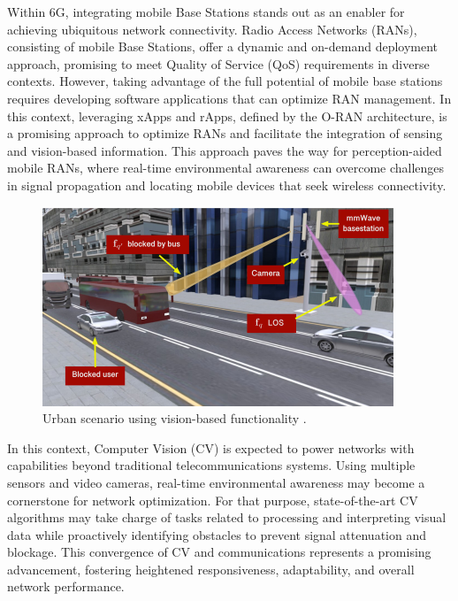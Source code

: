 Within 6G, integrating mobile Base Stations stands out as an enabler for achieving ubiquitous network connectivity. Radio Access Networks (RANs), consisting of mobile Base Stations, offer a dynamic and on-demand deployment approach, promising to meet Quality of Service (QoS) requirements in diverse contexts. However, taking advantage of the full potential of mobile base stations requires developing software applications that can optimize RAN management. In this context, leveraging xApps and rApps, defined by the O-RAN architecture, is a promising approach to optimize RANs and facilitate the integration of sensing and vision-based information. This approach paves the way for perception-aided mobile RANs, where real-time environmental awareness can overcome challenges in signal propagation and locating mobile devices that seek wireless connectivity.

\begin{figure}
    \centering
    \includegraphics{figures/urban_scenario.png}
    \caption[Urban scenario using vision-based functionality]{Urban scenario using vision-based functionality \cite{Block_predict}.}
    \label{fig:urban_scenario}
\end{figure}

In this context, Computer Vision (CV) is expected to power networks with capabilities beyond traditional telecommunications systems. Using multiple sensors and video cameras, real-time environmental awareness may become a cornerstone for network optimization. For that purpose, state-of-the-art CV algorithms may take charge of tasks related to processing and interpreting visual data while proactively identifying obstacles to prevent signal attenuation and blockage. This convergence of CV and communications represents a promising advancement, fostering heightened responsiveness, adaptability, and overall network performance.



